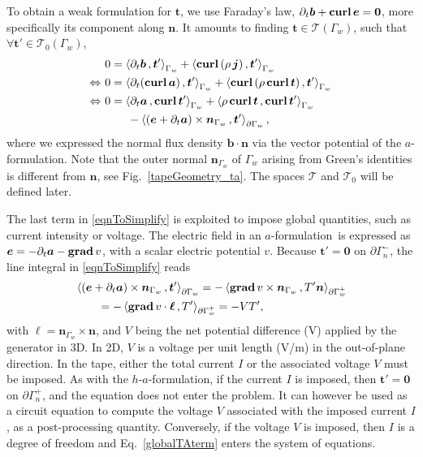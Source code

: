 \documentclass[journal]{IEEEtran}
\renewcommand{\vec}[1]{\boldsymbol{#1}} %
\newcommand{\parenangle}[1]{\left\langle#1\right\rangle}
\newcommand{\surInt}[3]{\parenangle{#1 \, , #2}_{#3}}
\newcommand{\grad}{\text{\textbf{grad}}\, }
\newcommand{\curl}{\text{\textbf{curl}}\, }
\renewcommand{\b}{\vec b}
\renewcommand{\a}{\vec a}
\renewcommand{\t}{\vec t}
\newcommand{\n}{\vec n}
\newcommand{\e}{\vec e}
\renewcommand{\j}{\vec j}
\newcommand{\dt}{\partial_t}
\newcommand{\af}{$a$-formulation\ }
\newcommand{\afOnly}{$a$-formulation}
\newcommand{\hafOnly}{$h$-$a$-formulation}
\newcommand{\tsp}{\mathcal{T}}
\newcommand{\tspz}{\mathcal{T}_{0}}
\begin{document}
To obtain a weak formulation for $\vec t$, we use Faraday's law, $\dt \b + \curl \e = \vec 0$, more specifically its component along $\n$. It amounts to finding $\t\in \tsp(\Gamma_w)$, such that $\forall \t'\in \tspz(\Gamma_w)$,
\begin{align}
& 0 = \surInt{\dt \b}{\t'}{\Gamma_w} + \surInt{\curl(\rho\, \j)}{\t'}{\Gamma_w}\notag \\
\Leftrightarrow\ & 0 = \surInt{\dt (\curl \a)}{\t'}{\Gamma_w} + \surInt{\curl(\rho\, \curl \t)}{\t'}{\Gamma_w}\notag \\
\Leftrightarrow\ & 0 = \surInt{\dt \a}{\curl \t'}{\Gamma_w} + \surInt{\rho\, \curl \t}{\curl \t'}{\Gamma_w}\notag \\
&\qquad - \surInt{(\e +\dt \a) \times \n_{\Gamma_w}}{\t'}{\partial\Gamma_w},\label{eqnToSimplify}
\end{align}
where we expressed the normal flux density $\b\cdot\n$ via the vector potential of the \afOnly.
Note that the outer normal $\n_{\Gamma_w}$ of $\Gamma_w$ arising from Green's identities is different from $\n$, see Fig.~\ref{tapeGeometry_ta}. %
The spaces $\tsp$ and $\tspz$ will be defined later.

The last term in \eqref{eqnToSimplify} is exploited to impose global quantities, such as current intensity or voltage.  The electric field in an \af is expressed as $\e = -\dt \a - \grad v$, with a scalar electric potential $v$. %
Because $\t' = \vec 0$ on $\partial \Gamma_n^-$, the line integral in \eqref{eqnToSimplify} reads
\begin{align}\label{globalTAterm}
&\surInt{(\e+\dt \a) \times \n_{\Gamma_w}}{\t'}{\partial\Gamma_w} = - \surInt{\grad v \times \n_{\Gamma_w}}{T'\n}{\partial\Gamma_w^+}\notag \\
&\qquad = - \surInt{\grad v \cdot \vec \ell}{T'}{\partial\Gamma_w^+} = -VT',
\end{align}
with $\vec \ell = \n_{\Gamma_w} \times \n$, and $V$ being the net potential difference (V) applied by the generator in 3D.  In 2D, $V$ is a voltage per unit length (V/m) in the out-of-plane direction. In the tape, either the total current $I$ or the associated voltage $V$ must be imposed. As with the \hafOnly, if the current $I$ is imposed, then $\t' = \vec 0$ on $\partial \Gamma_n^+$, and the equation does not enter the problem. It can however be used as a circuit equation to compute the voltage $V$ associated with the imposed current $I$, as a post-processing quantity. Conversely, if the voltage $V$ is imposed, then $I$ is a degree of freedom and Eq.~\ref{globalTAterm} enters the system of equations.
\end{document}
